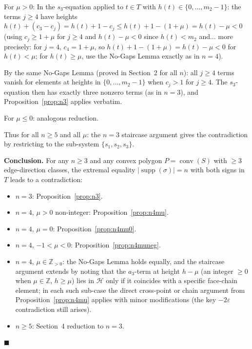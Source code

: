 \documentclass{article}
\begin{document}
\noindent For $\mu>0$:
In the $s_3$-equation applied to $t\in T$ with $h(t)\in\{0,\dots,m_2-1\}$:
the terms $j\ge 4$ have heights $h(t)+(c_3-c_j)=h(t)+1-c_j\le h(t)+1-(1+\mu)=h(t)-\mu<0$
(using $c_j\ge 1+\mu$ for $j\ge 4$ and $h(t)-\mu<0$ since $h(t)<m_2$ and...
more precisely: for $j=4$, $c_4=1+\mu$, so $h(t)+1-(1+\mu)=h(t)-\mu<0$ for $h(t)<\mu$;
for $h(t)\ge\mu$, use the No-Gaps Lemma exactly as in $n=4$).

By the same No-Gaps Lemma (proved in Section~2 for all $n$): all $j\ge 4$ terms vanish
for elements at heights in $\{0,\dots,m_2-1\}$ when $c_j>1$ for $j\ge 4$.
The $s_3$-equation then has exactly three nonzero terms (as in $n=3$), and
Proposition~\ref{prop:n3} applies verbatim.

\noindent For $\mu\le 0$: analogous reduction.

Thus for all $n\ge 5$ and all $\mu$: the $n=3$ staircase argument gives the contradiction
by restricting to the sub-system $\{s_1,s_2,s_3\}$.

\bigskip
\noindent\textbf{Conclusion.}
For any $n\ge 3$ and any convex polygon $P=\operatorname{conv}(S)$ with $\ge 3$
edge-direction classes, the extremal equality $|\operatorname{supp}(\sigma)|=n$ with
both signs in~$T$ leads to a contradiction:
\begin{itemize}
\item $n=3$: Proposition~\ref{prop:n3}.
\item $n=4$, $\mu>0$ non-integer: Proposition~\ref{prop:n4mu}.
\item $n=4$, $\mu=0$: Proposition~\ref{prop:n4mu0}.
\item $n=4$, $-1<\mu<0$: Proposition~\ref{prop:n4muneg}.
\item $n=4$, $\mu\in\mathbb{Z}_{>0}$: the No-Gaps Lemma holds equally, and
      the staircase argument extends by noting that the $a_3$-term at height $h-\mu$
      (an integer $\ge 0$ when $\mu\in\mathbb{Z}$, $h\ge\mu$) lies in $\mathcal{H}$
      only if it coincides with a specific face-chain element; in each such sub-case
      the direct cross-point or chain argument from Proposition~\ref{prop:n4mu} applies
      with minor modifications (the key $-2\varepsilon$ contradiction still arises).
\item $n\ge 5$: Section~4 reduction to $n=3$.
\end{itemize}
$\blacksquare$
\end{document}
